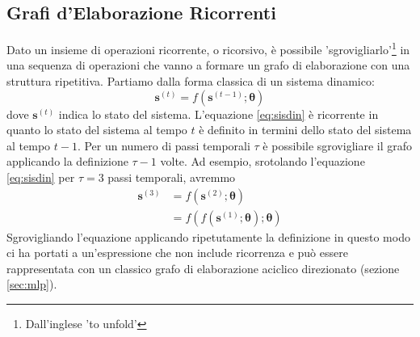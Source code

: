 \documentclass[12pt,a4paper]{report}
\begin{document}
    \subsection{Grafi d'Elaborazione Ricorrenti}
    Dato un insieme di operazioni ricorrente, o ricorsivo, \`e
    possibile 'sgrovigliarlo'\footnote{Dall'inglese 'to unfold'} 
    in una sequenza di operazioni che vanno a formare un grafo di 
    elaborazione con una struttura ripetitiva. Partiamo dalla forma
    classica di un sistema dinamico:
    \begin{equation} \label{eq:sisdin}
        \boldsymbol{s}^{(t)} =
        f(\boldsymbol{s}^{(t-1)};\boldsymbol{\theta})
    \end{equation}
    dove $\boldsymbol{s}^{(t)}$ indica lo stato del sistema.
    L'equazione \ref{eq:sisdin} \`e ricorrente in quanto lo stato
    del sistema al tempo $t$ \`e definito in termini dello stato
    del sistema al tempo $t-1$.
    Per un numero di passi temporali $\tau$ \`e possibile 
    sgrovigliare il grafo applicando la definizione $\tau-1$ volte.
    Ad esempio, srotolando l'equazione \ref{eq:sisdin} per $\tau=3$
    passi temporali, avremmo
    \begin{align} \label{eq:sisdinunfolded}
        \boldsymbol{s}^{(3)} &=
        f(\boldsymbol{s}^{(2)};\boldsymbol{\theta})\\
        &= f(f(\boldsymbol{s}^{(1)};\boldsymbol{\theta});
        \boldsymbol{\theta})
    \end{align}
    Sgrovigliando l'equazione applicando ripetutamente la 
    definizione in questo modo ci ha portati a un'espressione che 
    non include ricorrenza e pu\`o essere rappresentata con un 
    classico grafo di elaborazione aciclico direzionato (sezione 
    \ref{sec:mlp}).
\end{document}
